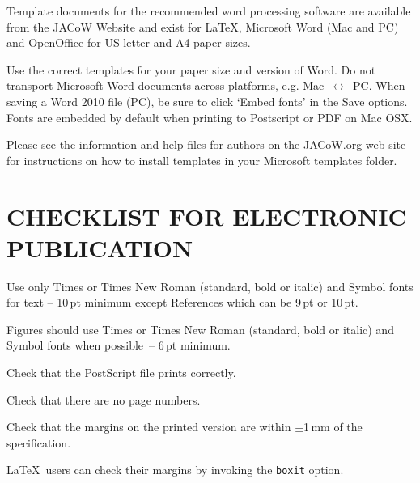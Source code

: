 \documentclass{JAC2003}
\begin{document}
Template documents for the recommended word processing software are
available from the JACoW Website and exist for
\LaTeX, Microsoft Word (Mac and PC) and OpenOffice for US letter and A4 paper sizes.

Use the correct templates for  your paper size and version of Word.
Do not transport Microsoft Word documents across platforms, e.g.
Mac~$\leftrightarrow$~PC. When saving a Word 2010 file (PC), be sure
to click `Embed fonts' in the Save options. Fonts are embedded by default when printing to Postscript or PDF on Mac OSX.

Please see the information and help files for authors on the JACoW.org web site
for instructions  on  how to install templates in your Microsoft templates folder.

\section{CHECKLIST FOR ELECTRONIC PUBLICATION}

\begin{Itemize}
    \item  Use only Times or Times New Roman (standard, bold or italic) and Symbol 
    			fonts for text -- 10\,pt minimum except References which can be 9\,pt or 10\,pt.
    \item  Figures should use Times or Times New Roman (standard, bold or italic) and Symbol fonts when possible~-- 6\,pt minimum.
    \item  Check that the PostScript file prints correctly.
    \item  Check that there are no page numbers.
    \item  Check that the margins on the printed version are within $\pm$1\,mm of the specification.
    \item  \LaTeX\ users can check their margins by invoking the
           \texttt{boxit} option.
\end{Itemize}
\end{document}
